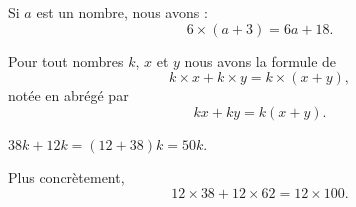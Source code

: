 \begin{example}
    Si \( a\) est un nombre, nous avons :
    \begin{equation}
        6\times (a+3)=6a+18.
    \end{equation}
\end{example}

\begin{propriete}
    Pour tout nombres \( k\), \( x\) et \( y\) nous avons la formule de 
    \begin{equation}
        k\times x+k\times y=k\times (x+y),
    \end{equation}
    notée en abrégé par
    \begin{equation}
        kx+ky=k(x+y).
    \end{equation}
\end{propriete}

\begin{example}
    \( 38k+12k=(12+38)k=50k\).

    Plus concrètement,
    \begin{equation}
        12\times 38+12\times 62=12\times 100.
    \end{equation}
\end{example}

